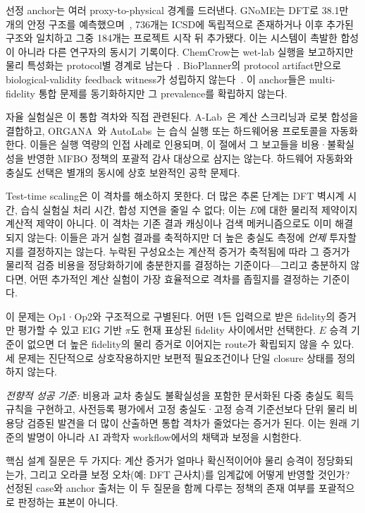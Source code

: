 \documentclass[11pt]{article}
\begin{document}
선정 anchor는 여러 proxy-to-physical 경계를 드러낸다. GNoME는 DFT로 38.1만 개의 안정 구조를 예측했으며~\citep{merchant2023gnome}, 736개는 ICSD에 독립적으로 존재하거나 이후 추가된 구조와 일치하고 그중 184개는 프로젝트 시작 뒤 추가됐다. 이는 시스템이 촉발한 합성이 아니라 다른 연구자의 동시기 기록이다. ChemCrow는 wet-lab 실행을 보고하지만 물리 특성화는 protocol별 경계로 남는다~\citep{bran2023chemcrow,gromski2019chemical}. BioPlanner의 protocol artifact만으로 biological-validity feedback witness가 성립하지 않는다~\citep{odonoghue2023bioplanner}. 이 anchor들은 multi-fidelity 통합 문제를 동기화하지만 그 prevalence를 확립하지 않는다.

자율 실험실은 이 통합 격차와 직접 관련된다. A-Lab~\citep{szymanski2023alab}은 계산 스크리닝과 로봇 합성을 결합하고, ORGANA~\citep{darvish2024organa}와 AutoLabs~\citep{panapitiya2025autolabs}는 습식 실행 또는 하드웨어용 프로토콜을 자동화한다. 이들은 실행 역량의 인접 사례로 인용되며, 이 절에서 그 보고들을 비용·불확실성을 반영한 MFBO 정책의 포괄적 감사 대상으로 삼지는 않는다. 하드웨어 자동화와 충실도 선택은 별개의 동시에 상호 보완적인 공학 문제다.

Test-time scaling은 이 격차를 해소하지 못한다. 더 많은 추론 단계는 DFT 벽시계 시간, 습식 실험실 처리 시간, 합성 지연을 줄일 수 없다; 이는 $E$에 대한 물리적 제약이지 계산적 제약이 아니다. 이 격차는 기존 결과 캐싱이나 검색 메커니즘으로도 이미 해결되지 않는다: 이들은 과거 실험 결과를 축적하지만 더 높은 충실도 측정에 \emph{언제} 투자할지를 결정하지는 않는다. 누락된 구성요소는 계산적 증거가 축적됨에 따라 그 증거가 물리적 검증 비용을 정당화하기에 충분한지를 결정하는 기준이다---그리고 충분하지 않다면, 어떤 추가적인 계산 실험이 가장 효율적으로 격차를 좁힐지를 결정하는 기준이다.

이 문제는 Op1·Op2와 구조적으로 구별된다. 어떤 $V$든 입력으로 받은 fidelity의 증거만 평가할 수 있고 EIG 기반 $\pi$도 현재 표상된 fidelity 사이에서만 선택한다. $E$ 승격 기준이 없으면 더 높은 fidelity의 물리 증거로 이어지는 route가 확립되지 않을 수 있다. 세 문제는 진단적으로 상호작용하지만 보편적 필요조건이나 단일 closure 상태를 정의하지 않는다.

\textit{전향적 성공 기준:} 비용과 교차 충실도 불확실성을 포함한 문서화된 다중 충실도 획득 규칙을 구현하고, 사전등록 평가에서 고정 충실도·고정 승격 기준선보다 단위 물리 비용당 검증된 발견을 더 많이 산출하면 통합 격차가 줄었다는 증거가 된다. 이는 원래 기준의 발명이 아니라 AI 과학자 workflow에서의 채택과 보정을 시험한다.

핵심 설계 질문은 두 가지다: 계산 증거가 얼마나 확신적이어야 물리 승격이 정당화되는가, 그리고 오라클 보정 오차(예: DFT 근사치)를 임계값에 어떻게 반영할 것인가? 선정된 case와 anchor 출처는 이 두 질문을 함께 다루는 정책의 존재 여부를 포괄적으로 판정하는 표본이 아니다.
\end{document}
